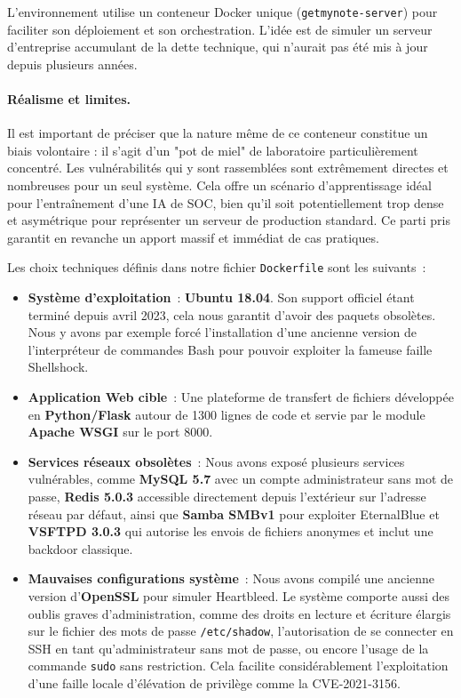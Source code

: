 \documentclass[runningheads]{llncs}
\begin{document}
L'environnement utilise un conteneur Docker unique (\texttt{getmynote-server}) pour faciliter son déploiement et son orchestration. L'idée est de simuler un serveur d'entreprise accumulant de la dette technique, qui n'aurait pas été mis à jour depuis plusieurs années.

\paragraph{Réalisme et limites.} Il est important de préciser que la nature même de ce conteneur constitue un biais volontaire : il s'agit d'un "pot de miel" de laboratoire particulièrement concentré. Les vulnérabilités qui y sont rassemblées sont extrêmement directes et nombreuses pour un seul système. Cela offre un scénario d'apprentissage idéal pour l'entraînement d'une IA de SOC, bien qu'il soit potentiellement trop dense et asymétrique pour représenter un serveur de production standard. Ce parti pris garantit en revanche un apport massif et immédiat de cas pratiques.

Les choix techniques définis dans notre fichier \texttt{Dockerfile} sont les suivants~:

\begin{itemize}
    \item \textbf{Système d'exploitation}~: \textbf{Ubuntu 18.04}. Son support officiel étant terminé depuis avril 2023, cela nous garantit d'avoir des paquets obsolètes. Nous y avons par exemple forcé l'installation d'une ancienne version de l'interpréteur de commandes Bash pour pouvoir exploiter la fameuse faille Shellshock.
    \item \textbf{Application Web cible}~: Une plateforme de transfert de fichiers développée en \textbf{Python/Flask} autour de 1300 lignes de code et servie par le module \textbf{Apache WSGI} sur le port 8000. 
    \item \textbf{Services réseaux obsolètes}~: Nous avons exposé plusieurs services vulnérables, comme \textbf{MySQL 5.7} avec un compte administrateur sans mot de passe, \textbf{Redis 5.0.3} accessible directement depuis l'extérieur sur l'adresse réseau par défaut, ainsi que \textbf{Samba SMBv1} pour exploiter EternalBlue et \textbf{VSFTPD 3.0.3} qui autorise les envois de fichiers anonymes et inclut une backdoor classique.
    \item \textbf{Mauvaises configurations système}~: Nous avons compilé une ancienne version d'\textbf{OpenSSL} pour simuler Heartbleed. Le système comporte aussi des oublis graves d'administration, comme des droits en lecture et écriture élargis sur le fichier des mots de passe \texttt{/etc/shadow}, l'autorisation de se connecter en SSH en tant qu'administrateur sans mot de passe, ou encore l'usage de la commande \texttt{sudo} sans restriction. Cela facilite considérablement l'exploitation d'une faille locale d'élévation de privilège comme la CVE-2021-3156.
\end{itemize}
\end{document}
